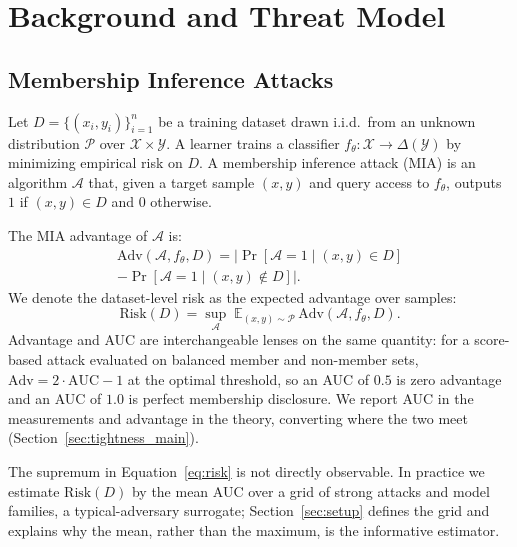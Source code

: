 
\section{Background and Threat Model}
\label{sec:background}

\subsection{Membership Inference Attacks}

Let $D = \{(x_i, y_i)\}_{i=1}^{n}$ be a training dataset drawn i.i.d.\
from an unknown distribution $\mathcal{P}$ over $\mathcal{X} \times \mathcal{Y}$.
A learner trains a classifier $f_\theta : \mathcal{X} \to \Delta(\mathcal{Y})$
by minimizing empirical risk on $D$.
A membership inference attack (MIA) is an algorithm
$\mathcal{A}$ that, given a target sample $(x, y)$ and query access to
$f_\theta$, outputs $1$ if $(x,y) \in D$ and $0$ otherwise.

The MIA advantage of $\mathcal{A}$ is:
\begin{multline}
  \mathrm{Adv}(\mathcal{A}, f_\theta, D)
  =
  \bigl|
    \Pr[\mathcal{A}=1 \mid (x,y)\in D] \\
    -
    \Pr[\mathcal{A}=1 \mid (x,y)\notin D]
  \bigr|.
  \label{eq:adv}
\end{multline}
We denote the dataset-level risk as the expected advantage over samples:
\begin{equation}
  \mathrm{Risk}(D) = \sup_{\mathcal{A}} \;\mathbb{E}_{(x,y)\sim\mathcal{P}}\,
  \mathrm{Adv}(\mathcal{A}, f_\theta, D).
  \label{eq:risk}
\end{equation}
Advantage and AUC are interchangeable lenses on the same quantity: for
a score-based attack evaluated on balanced member and non-member sets,
$\mathrm{Adv} = 2\cdot\mathrm{AUC} - 1$ at the optimal threshold, so an
AUC of $0.5$ is zero advantage and an AUC of $1.0$ is perfect
membership disclosure. We report AUC in the measurements and advantage
in the theory, converting where the two meet
(Section~\ref{sec:tightness_main}).

The supremum in Equation~\eqref{eq:risk} is not directly observable.
In practice we estimate $\mathrm{Risk}(D)$ by the mean AUC over a grid of
strong attacks and model families, a typical-adversary surrogate;
Section~\ref{sec:setup} defines the grid and explains why the mean,
rather than the maximum, is the informative estimator.


